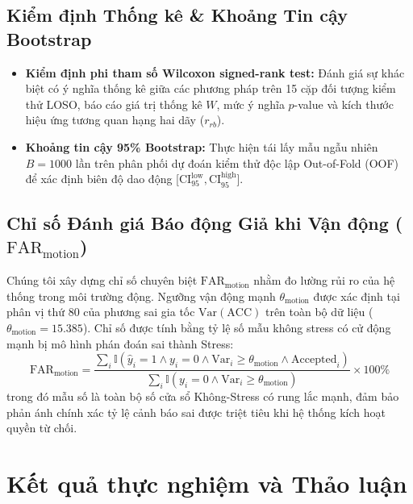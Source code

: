 \documentclass[conference]{IEEEtran}
\begin{document}
\subsection{Kiểm định Thống kê \& Khoảng Tin cậy Bootstrap}
\begin{itemize}
    \item \textbf{Kiểm định phi tham số Wilcoxon signed-rank test:} Đánh giá sự khác biệt có ý nghĩa thống kê giữa các phương pháp trên 15 cặp đối tượng kiểm thử LOSO, báo cáo giá trị thống kê $W$, mức ý nghĩa $p$-value và kích thước hiệu ứng tương quan hạng hai dãy ($r_{rb}$).
    \item \textbf{Khoảng tin cậy 95\% Bootstrap:} Thực hiện tái lấy mẫu ngẫu nhiên $B = 1000$ lần trên phân phối dự đoán kiểm thử độc lập Out-of-Fold (OOF) để xác định biên độ dao động [$\text{CI}_{95}^{\text{low}}, \text{CI}_{95}^{\text{high}}$].
\end{itemize}

\subsection{Chỉ số Đánh giá Báo động Giả khi Vận động \texorpdfstring{($\text{FAR}_{\text{motion}}$)}{(FAR-motion)}}
Chúng tôi xây dựng chỉ số chuyên biệt $\text{FAR}_{\text{motion}}$ nhằm đo lường rủi ro của hệ thống trong môi trường động. Ngưỡng vận động mạnh $\theta_{\text{motion}}$ được xác định tại phân vị thứ 80 của phương sai gia tốc $\text{Var}(\text{ACC})$ trên toàn bộ dữ liệu ($\theta_{\text{motion}} = 15.385$). Chỉ số được tính bằng tỷ lệ số mẫu không stress có cử động mạnh bị mô hình phán đoán sai thành Stress:
\begin{equation}
\text{FAR}_{\text{motion}} = \frac{\sum_{i} \mathbb{I}(\hat{y}_i = 1 \land y_i = 0 \land \text{Var}_i \ge \theta_{\text{motion}} \land \text{Accepted}_i)}{\sum_{i} \mathbb{I}(y_i = 0 \land \text{Var}_i \ge \theta_{\text{motion}})} \times 100\%
\end{equation}
trong đó mẫu số là toàn bộ số cửa sổ Không-Stress có rung lắc mạnh, đảm bảo phản ánh chính xác tỷ lệ cảnh báo sai được triệt tiêu khi hệ thống kích hoạt quyền từ chối.

\section{Kết quả thực nghiệm và Thảo luận}
\end{document}
